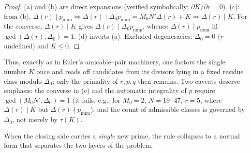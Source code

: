 \documentclass[11pt]{article}
\theoremstyle{definition}
\begin{document}
\begin{proof}
(a) and (b) are direct expansions (verified symbolically; $\partial K/\partial r=0$). (c): from
(b), $\Delta(r)\mid p_{\mathrm{num}}\Rightarrow\Delta(r)\mid\Delta_0p_{\mathrm{num}}
=M_0N'\Delta(r)+K\Rightarrow\Delta(r)\mid K$. For the converse, $\Delta(r)\mid K$ gives
$\Delta(r)\mid\Delta_0p_{\mathrm{num}}$, whence $\Delta(r)\mid p_{\mathrm{num}}$ iff
$\gcd(\Delta(r),\Delta_0)=1$. (d) inverts (a). Excluded degeneracies: $\Delta_0=0$ ($r$ undefined)
and $K\le0$.
\end{proof}

Thus, exactly as in Euler's amicable--pair machinery, one factors the single number $K$ once and
reads off candidates from its divisors lying in a fixed residue class modulo $\Delta_0$; only the
primality of $r,p,q$ then remains. Two caveats deserve emphasis:
the converse in (c) and the automatic integrality of $p$ require $\gcd(M_0N',\Delta_0)=1$ (it fails,
e.g., for $M_0=2$, $N=19\cdot47$, $r=5$, where $\Delta(r)\mid K$ but $\Delta(r)\nmid
p_{\mathrm{num}}$), and the count of admissible classes is governed by $\Delta_0$, not merely by
$\tau(K)$.

When the closing side carries a \emph{single} new prime, the rule collapses to a normal form that
separates the two layers of the problem.
\end{document}
